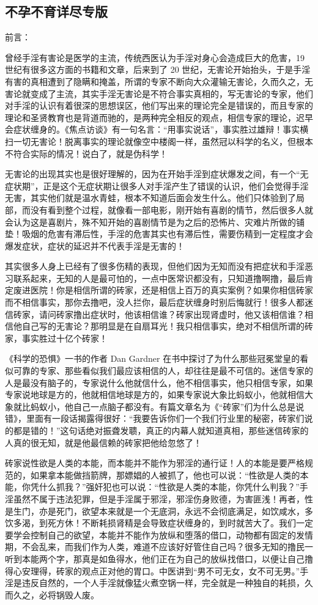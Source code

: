 \subsection{不孕不育详尽专版}

前言：

曾经手淫有害论是医学的主流，传统西医认为手淫对身心会造成巨大的危害，19 世纪有很多这方面的书籍和文章，后来到了 20 世纪，无害论开始抬头，于是手淫有害的真相遭到了隐瞒和掩盖，所谓的专家不断向大众灌输无害论，久而久之，无害论就变成了主流，其实手淫无害论是不符合事实真相的，写无害论的专家，他们对手淫的认识有着很深的思想误区，他们写出来的理论完全是错误的，而且专家的理论和圣贤教育也是背道而驰的，是两种完全相反的观点，相信专家的理论，迟早会症状缠身的。《焦点访谈》有一句名言：“用事实说话”，事实胜过雄辩！事实横扫一切无害论！脱离事实的理论就像空中楼阁一样，虽然冠以科学的名义，但根本不符合实际的情况！说白了，就是伪科学！

无害论的出现其实也是很好理解的，因为在开始手淫到症状爆发之间，有一个“无症状期”，正是这个无症状期让很多人对手淫产生了错误的认识，他们会觉得手淫无害，其实他们就是温水青蛙，根本不知道后面会发生什么。他们只体验到了局部，而没有看到整个过程，就像看一部电影，刚开始有喜剧的情节，然后很多人就会认为这是喜剧片，殊不知开始的喜剧情节是为之后的恐怖片、灾难片所做的铺垫！吸烟的危害有滞后性，手淫的危害其实也有滞后性，需要伤精到一定程度才会爆发症状，症状的延迟并不代表手淫是无害的！

其实很多人身上已经有了很多伤精的表现，但他们因为无知而没有把症状和手淫恶习联系起来，无知的人是最可怕的，一点中医常识都没有，只知道撸啊撸，最后肯定废进医院！你是相信所谓的砖家，还是相信上百万的真实案例？如果你相信砖家而不相信事实，那你去撸吧，没人拦你，最后症状缠身时别后悔就行！很多人都迷信砖家，请问砖家撸出症状时，他该相信谁？砖家出现肾虚时，他又该相信谁？相信他自己写的无害论？那明显是在自扇耳光！我只相信事实，绝对不相信所谓的砖家，事实胜过十亿个砖家！

《科学的恐惧》一书的作者 Dan Gardner 在书中探讨了为什么那些冠冕堂皇的看似可靠的专家、那些看似我们最应该相信的人，却往往是最不可信的。迷信专家的人是最没有脑子的，专家说什么他就信什么，他不相信事实，他只相信专家，如果专家说地球是方的，他就相信地球是方的，如果专家说大象比蚂蚁小，他就相信大象就比蚂蚁小，他自己一点脑子都没有。有篇文章名为《“砖家”们为什么总是说错》，里面有一段话揭露得很好：“我要告诉你们一个我们行业里的秘密，砖家们说的都是错的！”这句话绝对振聋发聩，真正的内幕人就知道真相，那些迷信砖家的人真的很无知，就是他最信赖的砖家把他给忽悠了！

砖家说性欲是人类的本能，而本能并不能作为邪淫的通行证！人的本能是要严格规范的，如果拿本能做挡箭牌，那嫖娼的人被抓了，他也可以说：“性欲是人类的本能，你凭什么抓我？”强奸犯也可以说：“性欲是人类的本能，你凭什么判我？”手淫虽然不属于违法犯罪，但是手淫属于邪淫，邪淫伤身败德，为害匪浅！再者，性是生门，亦是死门，欲望本来就是一个无底洞，永远不会彻底满足，如饮咸水，多饮多渴，到死方休！不断耗损肾精是会导致症状缠身的，到时就苦大了。我们一定要学会控制自己的欲望，本能并不能作为放纵和堕落的借口，动物都有固定的发情期，不会乱来，而我们作为人类，难道不应该好好管住自己吗？很多无知的撸民一听到本能两个字，那真是如鱼得水，他们正在为自己的放纵找借口，以便让自己撸得心安理得，砖家的观点正对他的胃口。中医讲到“男不可无女，女不可无男。”手淫是违反自然的，一个人手淫就像猛火煮空锅一样，完全就是一种独自的耗损，久而久之，必将锅毁人废。

